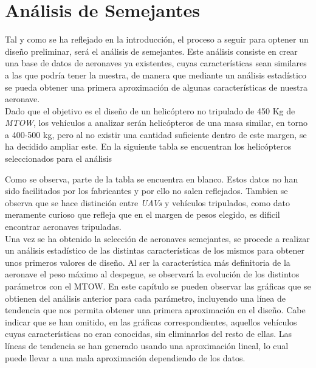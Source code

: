 \thispagestyle{empty}
\chapter{Análisis de Semejantes}

Tal y como se ha reflejado en la introducción, el proceso a seguir para optener un diseño preliminar, será el análisis de semejantes.
Este análisis consiste en crear una base de datos de aeronaves ya existentes, cuyas características sean similares a las que podría tener la nuestra, de manera que mediante un análisis estadístico se pueda obtener una primera aproximación de algunas características de nuestra aeronave.\\

Dado que el objetivo es el diseño de un helicóptero no tripulado de 450 Kg de \emph{MTOW}, los vehículos a analizar serán helicópteros de una masa similar, en torno a 400-500 kg, pero al no existir una cantidad suficiente dentro de este margen, se ha decidido ampliar este.
En la siguiente tabla se encuentran los helicópteros seleccionados para el análisis


Como se observa, parte de la tabla se encuentra en blanco. Estos datos no han sido facilitados por los fabricantes y por ello no salen reflejados.
Tambien se observa que se hace distinción entre \emph{UAVs} y vehículos tripulados, como dato meramente curioso que refleja que en el margen de pesos elegido, es dificil encontrar aeronaves tripuladas.\\

Una vez se ha obtenido la selección de aeronaves semejantes, se procede a realizar un análisis estadístico de las distintas características de los mismos para obtener unos primeros valores de diseño. Al ser la característica más definitoria de la aeronave el peso máximo al despegue, se observará la evolución de los distintos parámetros con el MTOW.
En este capítulo se pueden observar las gráficas que se obtienen del análisis anterior para cada parámetro, incluyendo una línea de tendencia que nos permita obtener una primera aproximación en el diseño. Cabe indicar que se han omitido, en las gráficas correspondientes, aquellos vehículos cuyas características no eran conocidas, sin eliminarlos del resto de ellas. Las líneas de tendencia se han generado usando una aproximación lineal, lo cual puede llevar a una mala aproximación dependiendo de los datos.


